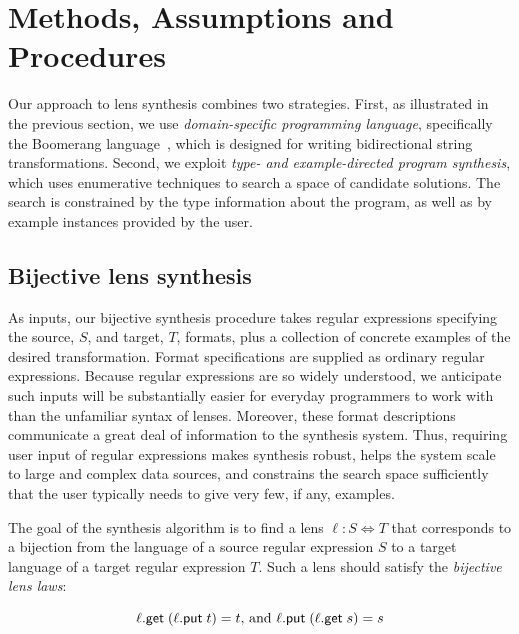 \documentclass[12pt]{article}
\begin{document}
{\section{Methods, Assumptions and Procedures}

Our approach to lens synthesis combines two strategies.  First, as
illustrated in the previous section, we use \textit{domain-specific
  programming language}, specifically the Boomerang  language~\cite{boomerang,
  Matching10}, which is designed for writing bidirectional string
transformations.  Second, we exploit \textit{type- and example-directed
  program synthesis}, which uses enumerative techniques to search a space of
candidate solutions.  The search is constrained by the type information
about the program, as well as by example instances provided by the user.


\subsection{Bijective lens synthesis}

As inputs, our bijective synthesis procedure takes regular expressions specifying the
source, $S$, and
target, $T$, formats, plus a collection of concrete examples of the desired 
transformation.  Format specifications are supplied as ordinary regular
expressions.
Because regular expressions are so widely understood, we anticipate such
inputs will be substantially easier for everyday programmers to work with
than the unfamiliar syntax of lenses.
Moreover, these format descriptions communicate a
great deal of information to the synthesis system.  Thus, requiring user input
of regular expressions makes synthesis robust, 
helps the system scale to large and complex data sources, and 
constrains the search space sufficiently that the user typically needs
to give very few, if any, examples.

The goal of the synthesis algorithm is to find a lens
$\ell : S \Leftrightarrow T$ that corresponds to a bijection from the language
of a source regular expression $S$ to a target language of a target regular
expression $T$.   Such a lens should satisfy the \textit{bijective lens laws}:

\begin{equation}\label{bijectivelenslaws} \ell.\mathsf{get} \;
  (\ell.\mathsf{put} \; t) = t \text{, and } \ell.\mathsf{put} \; (\ell.\mathsf{get} \; s) = s
\end{equation}

}
\end{document}
